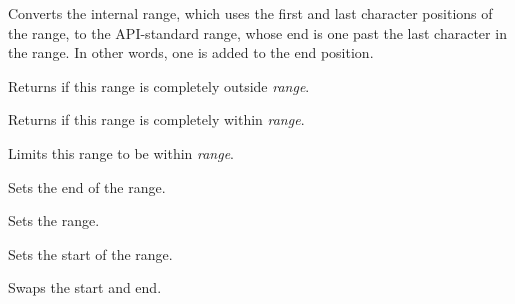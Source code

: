 \label{wxrichtextrangefrominternal}


Converts the internal range, which uses the first and last character positions of the range,
to the API-standard range, whose end is one past the last character in the range.
In other words, one is added to the end position.

\label{wxrichtextrangeisoutside}


Returns \true if this range is completely outside {\it range}.

\label{wxrichtextrangeiswithin}


Returns \true if this range is completely within {\it range}.

\label{wxrichtextrangelimitto}


Limits this range to be within {\it range}.

\label{wxrichtextrangesetend}


Sets the end of the range.

\label{wxrichtextrangesetrange}


Sets the range.

\label{wxrichtextrangesetstart}


Sets the start of the range.

\label{wxrichtextrangeswap}


Swaps the start and end.

\label{wxrichtextrangetointernal}



